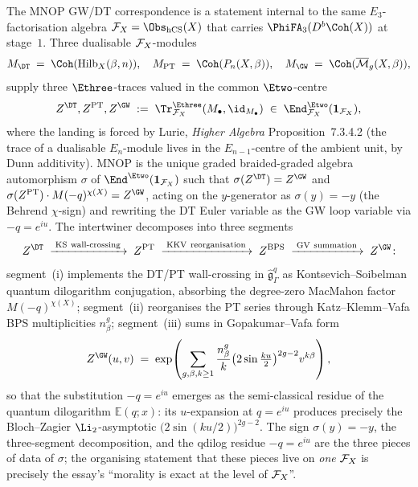 \begin{remark}
\label{rem:v3-intro-mnop-sigma-intertwiner}
The MNOP GW/DT correspondence is a statement internal to the same $E_3$-factorisation algebra $\cF_X = \Obs_\hCS(X)$ that carries $\PhiFA_3(D^b\Coh(X))$ at stage~$1$. Three dualisable $\mathcal{F}_X$-modules
\[
 M_{\DT} \;=\; \Coh(\mathrm{Hilb}_X(\beta, n)), \quad
 M_{\mathrm{PT}} \;=\; \Coh(P_n(X, \beta)), \quad
 M_{\GW} \;=\; \Coh(\overline{\cM}_g(X, \beta)),
\]
supply three $\Ethree$-traces valued in the common $\Etwo$-centre
\[
 Z^{\DT}, Z^{\mathrm{PT}}, Z^{\GW} \;:=\; \Tr^{\Ethree}_{\cF_X}(M_\bullet, \id_{M_\bullet})
 \;\in\; \End^{\Etwo}_{\cF_X}(\mathbf{1}_{\cF_X}),
\]
where the landing is forced by Lurie, \emph{Higher Algebra} Proposition~7.3.4.2 (the trace of a dualisable $E_n$-module lives in the $E_{n-1}$-centre of the ambient unit, by Dunn additivity). MNOP is the unique graded braided-graded algebra automorphism $\sigma$ of $\End^{\Etwo}(\mathbf{1}_{\cF_X})$ such that $\sigma(Z^{\DT}) = Z^{\GW}$ and $\sigma(Z^{\mathrm{PT}}) \cdot M(-q)^{\chi(X)} = Z^{\GW}$, acting on the $y$-generator as $\sigma(y) = -y$ (the Behrend $\chi$-sign) and rewriting the DT Euler variable as the GW loop variable via $-q = e^{iu}$. The intertwiner decomposes into three segments
\[
 Z^{\DT} \;\xrightarrow{\;\mathrm{KS\ wall\text{-}crossing}\;}\; Z^{\mathrm{PT}}
 \;\xrightarrow{\;\mathrm{KKV\ reorganisation}\;}\; Z^{\mathrm{BPS}}
 \;\xrightarrow{\;\mathrm{GV\ summation}\;}\; Z^{\GW}\!:
\]
segment~(i) implements the DT/PT wall-crossing in $\widehat{\mathfrak g}_\Gamma^q$ as Kontsevich--Soibelman quantum dilogarithm conjugation, absorbing the degree-zero MacMahon factor $M(-q)^{\chi(X)}$; segment~(ii) reorganises the PT series through Katz--Klemm--Vafa BPS multiplicities $n^g_\beta$; segment~(iii) sums in Gopakumar--Vafa form
\[
 Z^{\GW}(u, v) \;=\; \exp\!\left(\sum_{g, \beta, k \ge 1}
 \frac{n^g_\beta}{k}\bigl(2\sin\tfrac{ku}{2}\bigr)^{2g-2} v^{k\beta}\right),
\]
so that the substitution $-q = e^{iu}$ emerges as the semi-classical residue of the quantum dilogarithm $\mathbb{E}(q; x)$: its $u$-expansion at $q = e^{iu}$ produces precisely the Bloch--Zagier $\Li_2$-asymptotic $\bigl(2\sin(ku/2)\bigr)^{2g-2}$. The sign $\sigma(y) = -y$, the three-segment decomposition, and the qdilog residue $-q = e^{iu}$ are the three pieces of data of $\sigma$; the organising statement that these pieces live on \emph{one} $\mathcal{F}_X$ is precisely the essay's ``morality is exact at the level of $\mathcal{F}_X$''.
\end{remark}

